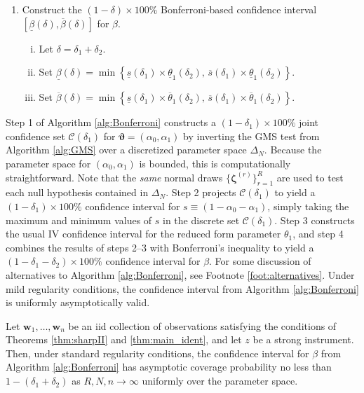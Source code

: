 \begin{alg}
\begin{enumerate}
\begin{enumerate}[(i)]
      \end{enumerate}
    \item Construct the $(1 - \delta)\times 100\%$ Bonferroni-based confidence interval $\left[ \underline{\beta}(\delta), \overline{\beta}(\delta) \right]$ for $\beta$.
      \begin{enumerate}[(i)]
        \item Let $\delta = \delta_1 + \delta_2$.
        \item Set $\underline{\beta}(\delta) = \min \left\{ \underline{s}(\delta_1)\times \underline{\theta}_1(\delta_2),\, \overline{s}(\delta_1)\times \underline{\theta}_1(\delta_2) \right\}$.
        \item Set $\overline{\beta}(\delta) = \min \left\{ \underline{s}(\delta_1)\times \overline{\theta}_1(\delta_2),\, \overline{s}(\delta_1)\times \overline{\theta}_1(\delta_2) \right\}$.
      \end{enumerate}
  \end{enumerate}
  \label{alg:Bonferroni}
\end{alg}

Step 1 of Algorithm \ref{alg:Bonferroni} constructs a $(1 - \delta_1)\times 100\%$ joint confidence set $\mathcal{C}(\delta_1)$ for $\boldsymbol{\vartheta} = (\alpha_0, \alpha_1)$ by inverting the GMS test from Algorithm \ref{alg:GMS} over a discretized parameter space $\Delta_N$.
Because the parameter space for $(\alpha_0, \alpha_1)$ is bounded, this is computationally straightforward.
Note that the \emph{same} normal draws $\{\boldsymbol{\zeta}^{(r)}\}_{r=1}^R$ are used to test each null hypothesis contained in $\Delta_N$.
Step 2 projects $\mathcal{C}(\delta_1)$ to yield a $(1 - \delta_1)\times 100\%$ confidence interval for $s \equiv (1 - \alpha_0 - \alpha_1)$, simply taking the maximum and minimum values of $s$ in the discrete set  $\mathcal{C}(\delta_1)$.
Step 3 constructs the usual IV confidence interval for the reduced form parameter $\theta_1$, and step 4 combines the results of steps 2--3 with Bonferroni's inequality to yield a $(1 - \delta_1 - \delta_2) \times 100\%$ confidence interval for $\beta$.
For some discussion of alternatives to Algorithm \ref{alg:Bonferroni}, see Footnote \ref{foot:alternatives}.
Under mild regularity conditions, the confidence interval from Algorithm \ref{alg:Bonferroni} is uniformly asymptotically valid.

\begin{thm}
  Let $\mathbf{w}_1, \hdots, \mathbf{w}_n$ be an iid collection of observations satisfying the conditions of Theorems \ref{thm:sharpII} and \ref{thm:main_ident}, and let $z$ be a strong instrument.
  Then, under standard regularity conditions, the confidence interval for $\beta$ from Algorithm \ref{alg:Bonferroni} has asymptotic coverage probability no less than $1 - (\delta_1 + \delta_2)$ as $R,N,n\rightarrow \infty$ uniformly over the parameter space.
  \label{thm:uniform}
\end{thm}

